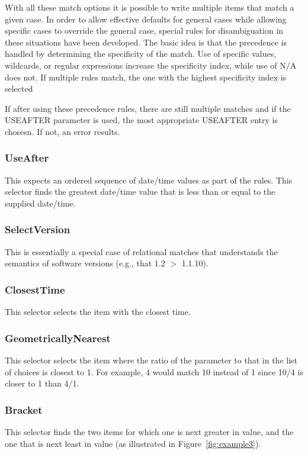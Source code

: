 \documentclass[final,authoryear,5p,times,twocolumn]{elsarticle}
\begin{document}
With all these match options it is possible to write multiple items that 
match a given case. In order to allow effective defaults for general cases
while allowing specific cases to override the general case, special rules
for disambiguation in these situations have been developed. The basic idea
is that the precedence is handled by determining the specificity of the
match. Use of specific values, wildcards, or regular expressions increase
the specificity index, while use of N/A does not. If multiple rules match,
the one with the highest specificity index is selected

If after using these precedence rules, there are still multiple matches and 
if the USEAFTER parameter is used, the most appropriate USEAFTER entry is
chosesn. If not, an error results.

\subsubsection{UseAfter}
This expects an ordered sequence of date/time values as part of the rules.
This selector finds the greatest date/time value that is less than or equal
to the supplied date/time.

\subsubsection{SelectVersion}
This is essentially a special case of relational matches that understands
the semantics of software versions (e.g., that 1.2 $>$ 1.1.10). 

\subsubsection{ClosestTime}
This selector selects the item with the closest time.

\subsubsection{GeometricallyNearest}
This selector selects the item where the ratio of the parameter to that
in the list of choices is closest to 1. For example, 4 would match 10 
instead of 1 since 10/4 is closer to 1 than 4/1.

\subsubsection{Bracket}
This selector finds the two items for which one is next greater in value,
and the one that is next least in value (as illustrated in
Figure~\ref{fig:example3}).
\end{document}
